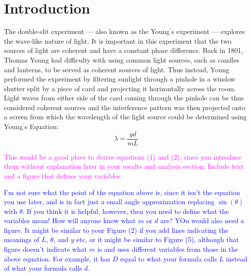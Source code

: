\documentclass[prb,preprint]{revtex4-1}
\begin{document}
\maketitle 

\section{Introduction}
The double-slit experiment --- also known as the Young$^\prime$s experiment --- explores the wave-like nature of light. It is important in this experiment that the two sources of light are coherent and have a constant phase difference.
Back in 1801, Thomas Young had difficulty with using common light sources, such as candles and lanterns, to be served as coherent sources of light. Thus instead, Young performed the experiment by filtering sunlight through a pinhole in a window shutter split by a piece of card and projecting it horizontally across the room. Light waves from either side of the card coming through the pinhole can be thus considered coherent sources and the interference pattern was then projected onto a screen from which the wavelength of the light source could be determined using Young$^\prime$s Equation: $$\lambda=\frac{y d}{m L}$$

\textcolor{magenta}{This would be a good place to derive equations (1) and (2), since you introduce them without explanation later in your results and analysis section. Include text and a figure that defines your variables.}

\textcolor{blue}{I'm not sure what the point of the equation above is, since it isn't the equation you use later, and is in fact just a small angle approximation replacing $\sin(\theta)$ with $\theta$. If you think it is helpful, however, then you need to define what the variables mean!  How will anyone know what $m$ or $d$ are?  YOu would also need a figure. It might be similar to your Figure (2) if you add lines indicating the meanings of $L$, $\theta$, and $y$ etc, or it might be similar to Figure (5), although that figure doesn't indicate what $m$ is and uses different variables from those in the above equation. For example, it has $D$ equal to what your formula calls $L$ instead of what your formula calls $d$.  } 
\end{document}
